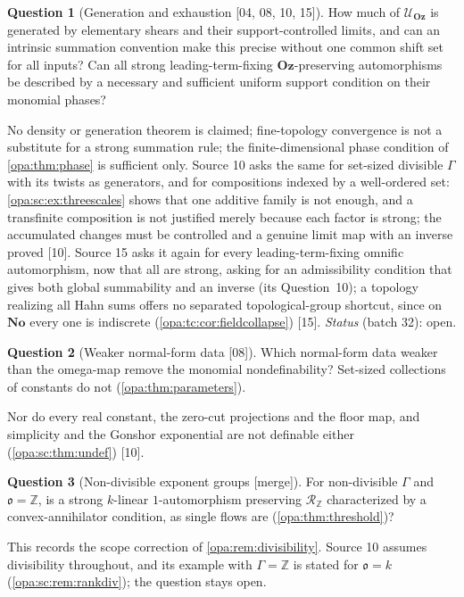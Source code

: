 \documentclass[11pt,oneside]{article}
\numberwithin{equation}{section}
\theoremstyle{definition}
\newtheorem{question}[question]{Question}
\theoremstyle{remark}
\newcommand{\No}{\mathbf{No}}
\newcommand{\Oz}{\mathbf{Oz}}
\newcommand{\Z}{\mathbb Z}
\newcommand{\oo}{\mathfrak o}
\newcommand{\UU}{\mathcal U}
\newcommand{\src}[1]{\textup{\textsf{\small[#1]}}}
\newcommand{\mergetag}{\textup{\textsf{\small[merge]}}}
\begin{document}
\begin{question}[Generation and exhaustion \src{04, 08, 10, 15}]\label{opa:q:generation}
How much of $\UU_\Oz$ is generated by elementary shears and their
support-controlled limits, and can an intrinsic summation convention make this
precise without one common shift set for all inputs? Can all strong
leading-term-fixing $\Oz$-preserving automorphisms be described by a necessary and
sufficient uniform support condition on their monomial phases?
\end{question}
No density or generation theorem is claimed; fine-topology convergence is not a
substitute for a strong summation rule; the finite-dimensional phase condition of
\cref{opa:thm:phase} is sufficient only. Source 10 asks the same for set-sized
divisible $\Gamma$ with its twists as generators, and for compositions indexed by a
well-ordered set: \cref{opa:sc:ex:threescales} shows that one additive family is
not enough, and a transfinite composition is not justified merely because each
factor is strong; the accumulated changes must be controlled and a genuine limit
map with an inverse proved \src{10}. Source 15 asks it again for every leading-term-fixing
omnific automorphism, now that all are strong, asking for an admissibility condition that
gives both global summability and an inverse (its Question~10); a topology realizing all
Hahn sums offers no separated topological-group shortcut, since on $\No$ every one is
indiscrete (\cref{opa:tc:cor:fieldcollapse}) \src{15}. \emph{Status} (batch 32): open.

\begin{question}[Weaker normal-form data \src{08}]\label{opa:q:weaker}
Which normal-form data weaker than the omega-map remove the monomial
nondefinability? Set-sized collections of constants do not
(\cref{opa:thm:parameters}).
\end{question}
Nor do every real constant, the zero-cut projections and the floor map, and
simplicity and the Gonshor exponential are not definable either
(\cref{opa:sc:thm:undef}) \src{10}.

\begin{question}[Non-divisible exponent groups \mergetag]\label{opa:q:nondivisible}
For non-divisible $\Gamma$ and $\oo=\Z$, is a strong $k$-linear $1$-automorphism
preserving $\mathcal R_\Z$ characterized by a convex-annihilator condition, as
single flows are (\cref{opa:thm:threshold})?
\end{question}
This records the scope correction of \cref{opa:rem:divisibility}. Source 10
assumes divisibility throughout, and its example with $\Gamma=\Z$ is stated for
$\oo=k$ (\cref{opa:sc:rem:rankdiv}); the question stays open.
\end{document}
